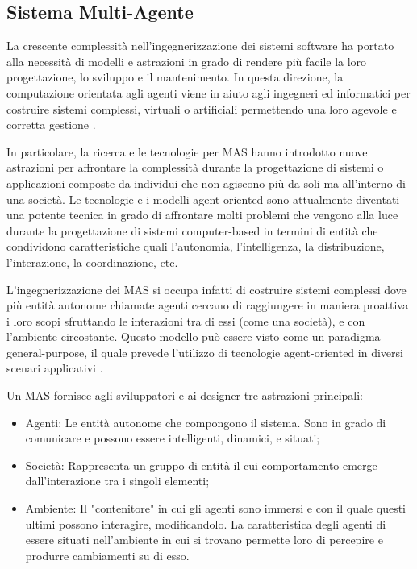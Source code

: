 \subsection{Sistema Multi-Agente} \label{sistema_multi-agente}

La crescente complessità nell'ingegnerizzazione dei sistemi software ha portato alla necessità di modelli e astrazioni in grado di rendere più facile la loro progettazione, lo sviluppo e il mantenimento. In questa direzione, la computazione orientata agli agenti viene in aiuto agli ingegneri ed informatici per costruire sistemi complessi, virtuali o artificiali permettendo una loro agevole e corretta gestione \cite{mas-as-complex-systems}.

\medskip

In particolare, la ricerca e le tecnologie per MAS hanno introdotto nuove astrazioni per affrontare la complessità durante la progettazione di sistemi o applicazioni composte da individui che non agiscono più da soli ma all'interno di una società. Le tecnologie e i modelli agent-oriented sono attualmente diventati una potente tecnica in grado di affrontare molti problemi che vengono alla luce durante la progettazione di sistemi computer-based in termini di entità che condividono caratteristiche quali l'autonomia, l'intelligenza, la distribuzione, l'interazione, la coordinazione, etc.

\medskip

L’ingegnerizzazione dei MAS si occupa infatti di costruire sistemi complessi dove più entità autonome chiamate agenti cercano di raggiungere in maniera proattiva i loro scopi sfruttando le interazioni tra di essi (come una società), e con l'ambiente circostante. Questo modello può essere visto come un paradigma general-purpose, il quale prevede l'utilizzo di tecnologie agent-oriented in diversi scenari applicativi \cite{aose-jaamas9}.

\medskip

Un MAS fornisce agli sviluppatori e ai designer tre astrazioni principali:
\begin{itemize}
    \item Agenti: Le entità autonome che compongono il sistema. Sono in grado di comunicare e possono essere intelligenti, dinamici, e situati;
    \item Società: Rappresenta un gruppo di entità il cui comportamento emerge dall'interazione tra i singoli elementi;
    \item Ambiente: Il "contenitore" in cui gli agenti sono immersi e con il quale questi ultimi possono interagire, modificandolo. La caratteristica degli agenti di essere situati nell'ambiente in cui si trovano permette loro di percepire e produrre cambiamenti su di esso.
\end{itemize}
